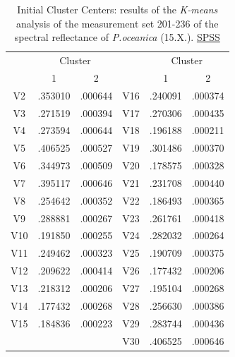 \documentclass[11pt]{article}
\begin{document}
\begin{appendices}
\begin{table}[htbp]
	\caption{Initial Cluster Centers: results of the \textit{K-means} analysis of the measurement set 201-236 of the spectral reflectance of \textit{P.oceanica} (15.X.).  \href{http://www.spss.com/}{SPSS}}
	\label{tab:13}
	\begin{center}
	\begin{tabular}{|c|c|c|c|c|c|}
		\hline\hline
		& \multicolumn{2}{|c|}{Cluster} &  & \multicolumn{2}{|c|}{Cluster}\\
		 & 1 & 2 &  & 1 & 2 \\ \hline\hline
		V2 &	.353010 &	.000644 &	V16 &	.240091 &	.000374 \\ \hline
		V3 &	 .271519 &	.000394 &	V17 &	.270306 &	.000435 \\ \hline
		V4 &	.273594 &	.000644 &	V18 &	.196188 &	.000211 \\ \hline
		V5 &	.406525 &	.000527 &	V19 &	.301486 &	.000370 \\ \hline
		V6 &	.344973 &	.000509 &	V20 &	.178575 &	.000328 \\ \hline
		V7 &	.395117 &	.000646 &	V21 &	.231708 &	.000440 \\ \hline
		V8 &	.254642 &	.000352 &	V22 &	.186493 &	.000365 \\ \hline
		V9 &	.288881 &	.000267 &	V23 &	.261761 &	.000418 \\ \hline
		V10 &	.191850 &	.000255 &	V24 &	.282032 &	.000264 \\ \hline
		V11 &	.249462 &	.000323 &	V25 &	.190709 &	.000375 \\ \hline
		V12 &	.209622 &	.000414 &	V26 &	.177432 &	.000206 \\ \hline
		V13 &	.218312 &	.000206 &	V27 &	.195104 &	.000268 \\ \hline
		V14 &	.177432 &	.000268 &	V28 &	.256630 &	.000386 \\ \hline
		V15 &	.184836 &	.000223 &	V29 &	.283744 &	.000436 \\ \hline
		 &	 &	 &		V30 &	.406525 &	.000646 \\ \hline
	\end{tabular}
	\end{center}
	\label{tab:20}
\end{table}


\end{appendices}
\end{document}
